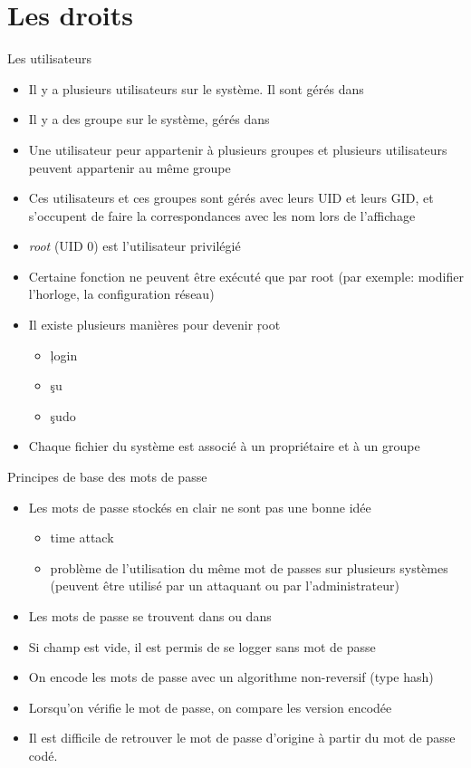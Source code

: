 \section{Les droits}

\begin{frame}[fragile=singleslide]{Les utilisateurs}
  \begin{itemize}
  \item Il  y a plusieurs utilisateurs  sur le système.  Il sont gérés
    dans 
  \item Il y a des groupe sur le système, gérés dans 
  \item  Une  utilisateur  peur  appartenir  à  plusieurs  groupes  et
    plusieurs utilisateurs peuvent appartenir au même groupe
  \item Ces utilisateurs  et ces groupes sont gérés avec  leurs UID et leurs
    GID,  et   s'occupent de faire
    la correspondances avec les nom lors de l'affichage
  \item \emph{root} (UID 0) est l'utilisateur privilégié
  \item Certaine  fonction ne peuvent  être exécuté que par  root (par
    exemple: modifier l'horloge, la configuration réseau)
  \item Il existe plusieurs manières pour devenir \c{root}
    \begin{itemize}
    \item \c{login}
    \item \c{su}
    \item \c{sudo}
    \end{itemize}
  \item Chaque fichier  du système est associé à  un propriétaire et à
    un groupe
  \end{itemize}
\end{frame}

\begin{frame}[fragile=singleslide]{Principes de base des mots de passe}
\begin{itemize} 
\item Les mots de passe stockés en clair ne sont pas une bonne idée
  \begin{itemize}
  \item time attack 
  \item problème de l'utilisation du  même mot de passes sur plusieurs
    systèmes   (peuvent être   utilisé   par  un   attaquant  ou   par
    l'administrateur)
  \end{itemize} 
\item Les  mots de passe  se trouvent dans   ou dans
\item Si champ est vide, il est permis de se logger sans mot de passe
\item  On encode  les mots  de passe  avec un  algorithme non-reversif
  (type hash)
\item  Lorsqu'on vérifie  le  mot  de passe,  on  compare les  version
  encodée
\item Il est difficile de retrouver le mot de passe d'origine à partir
  du mot de passe codé.
\end{itemize}
\end{frame}

